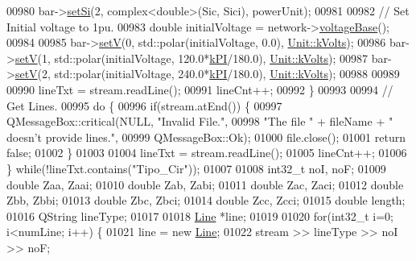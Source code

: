 \begin{DoxyCode}
00980     bar->\hyperlink{group___models_ga85e2a9b8a281900333fd65d1b532acfd}{setSi}(2, complex<double>(Sic, Sici), powerUnit);
00981 
00982     \textcolor{comment}{// Set Initial voltage to 1pu.}
00983     \textcolor{keywordtype}{double} initialVoltage = network->\hyperlink{group___models_ga88cd2506aaf0b19513e41f00608093e0}{voltageBase}();
00984 
00985     bar->\hyperlink{group___models_ga8d1e70b2d11ed4245e81b8b20858079d}{setV}(0, std::polar(initialVoltage, 0.0), \hyperlink{class_unit_a55b07dfa9457e1eca2c7194fe0cfc3c1aa54b2473993a702a3923525765bd6e4c}{Unit::kVolts});
00986     bar->\hyperlink{group___models_ga8d1e70b2d11ed4245e81b8b20858079d}{setV}(1, std::polar(initialVoltage, 120.0*\hyperlink{math__constants_8h_a368d99984512d9a6c6f18b37b4446431}{kPI}/180.0), 
      \hyperlink{class_unit_a55b07dfa9457e1eca2c7194fe0cfc3c1aa54b2473993a702a3923525765bd6e4c}{Unit::kVolts});
00987     bar->\hyperlink{group___models_ga8d1e70b2d11ed4245e81b8b20858079d}{setV}(2, std::polar(initialVoltage, 240.0*\hyperlink{math__constants_8h_a368d99984512d9a6c6f18b37b4446431}{kPI}/180.0), 
      \hyperlink{class_unit_a55b07dfa9457e1eca2c7194fe0cfc3c1aa54b2473993a702a3923525765bd6e4c}{Unit::kVolts});
00988 
00989 
00990     lineTxt = stream.readLine();
00991     lineCnt++;
00992   \}
00993 
00994   \textcolor{comment}{// Get Lines.}
00995   \textcolor{keywordflow}{do} \{
00996     \textcolor{keywordflow}{if}(stream.atEnd()) \{
00997       QMessageBox::critical(NULL, \textcolor{stringliteral}{"Invalid File."},
00998                             \textcolor{stringliteral}{"The file "} + fileName + \textcolor{stringliteral}{" doesn't provide lines."},
00999                             QMessageBox::Ok);
01000       file.close();
01001       \textcolor{keywordflow}{return} \textcolor{keyword}{false};
01002     \}
01003 
01004     lineTxt = stream.readLine();
01005     lineCnt++;
01006   \} \textcolor{keywordflow}{while}(!lineTxt.contains(\textcolor{stringliteral}{"Tipo\_Cir"}));
01007 
01008   int32\_t noI, noF;
01009   \textcolor{keywordtype}{double} Zaa, Zaai;
01010   \textcolor{keywordtype}{double} Zab, Zabi;
01011   \textcolor{keywordtype}{double} Zac, Zaci;
01012   \textcolor{keywordtype}{double} Zbb, Zbbi;
01013   \textcolor{keywordtype}{double} Zbc, Zbci;
01014   \textcolor{keywordtype}{double} Zcc, Zcci;
01015   \textcolor{keywordtype}{double} length;
01016   QString lineType;
01017 
01018   \hyperlink{class_line}{Line} *line;
01019 
01020   \textcolor{keywordflow}{for}(int32\_t i=0; i<numLine; i++) \{
01021     line = \textcolor{keyword}{new} \hyperlink{class_line}{Line};
01022     stream >> lineType >> noI >> noF;

\end{DoxyCode}
